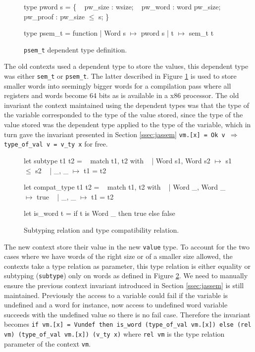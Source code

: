 \documentclass{article}
\begin{document}
\medskip

\begin{figure}
\obeylines\obeyspaces\ttfamily%
type pword s = \{
~ pw\_size  : wsize;
~ pw\_word  : word pw\_size;
~ pw\_proof : pw\_size \(\leq\) s;
\}

type psem\_t = function
| Word s \(\mapsto\) pword s
| t      \(\mapsto\) sem\_t t
\normalfont%
\caption{\texttt{psem\_t} dependent type definition.}\label{fig:psemt}
\end{figure}

The old contexts used a dependent type to store the values, this dependent type
was either \texttt{sem\_t} or \texttt{psem\_t}. The latter described in Figure
\ref{fig:psemt} is used to store smaller words into seemingly bigger words for
a compilation pass where all registers and words become 64 bits as is available
in a x86 processor. The old invariant the context maintained using the dependent
types was that the type of the variable corresponded to the type of the value
stored, since the type of the value stored was the dependent type applied to the
type of the variable, which in turn gave the invariant presented in Section
\ref{ssec:jassem}
\texttt{vm.[x] = Ok v \(\Longrightarrow\) type\_of\_val v = v\_ty x} for free.

\begin{figure}[t]
\obeylines\obeyspaces\ttfamily%
let subtype t1 t2 =
~ match t1, t2 with
~ | Word s1, Word s2 \(\mapsto\) s1 \(\leq\) s2
~ | \_,       \_       \(\mapsto\) t1 = t2

let compat\_type t1 t2 =
~ match t1, t2 with
~ | Word \_, Word \_ \(\mapsto\) true
~ | \_,      \_      \(\mapsto\) t1 = t2

let is\_word t = if t is Word \_ then true else false
\normalfont%
\caption{Subtyping relation and type compatibility relation.}\label{fig:typerel}
\end{figure}

The new context store their value in the new \texttt{value} type. To account for
the two cases where we have words of the right size or of a smaller size
allowed, the contexts take a type relation as parameter, this type relation is
either equality or subtyping (\texttt{subtype}) only on words as defined in
Figure \ref{fig:typerel}. We need to manually ensure the previous context
invariant introduced in Section \ref{ssec:jassem} is still maintained.
Previously the access to a variable could fail if the variable is undefined and
a word for instance, now access to undefined word variable succeeds with the
undefined value so there is no fail case. Therefore the invariant becomes
\texttt{if vm.[x] = Vundef then is\_word (type\_of\_val vm.[x]) else (rel vm) (type\_of\_val vm.[x]) (v\_ty x)}
where \texttt{rel vm} is the type relation parameter of the context \texttt{vm}.
\end{document}
